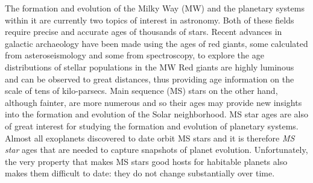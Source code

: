 
The formation and evolution of the Milky Way (MW) and the planetary systems
within it are currently two topics of interest in astronomy.
Both of these fields require precise and accurate ages of thousands of stars.
Recent advances in galactic archaeology have been made using the ages of red
giants, some calculated from asteroseismology and some from spectroscopy, to
explore the age distributions of stellar populations in the MW
Red giants are highly luminous and can be observed to great distances, thus
providing age information on the scale of tens of kilo-parsecs.
Main sequence (MS) stars on the other hand, although fainter, are more
numerous and so their ages may provide new insights into the formation and
evolution of the Solar neighborhood.
MS star ages are also of great interest for studying the formation and
evolution of planetary systems.
Almost all exoplanets discovered to date orbit MS stars and it is therefore
{\it MS star} ages that are needed to capture snapshots of planet evolution.
Unfortunately, the very property that makes MS stars good hosts for habitable
planets also makes them difficult to date: they do not change substantially
over time.

